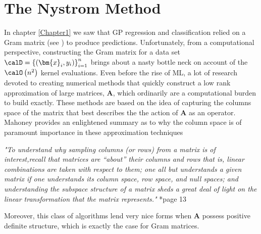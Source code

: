 \section{The Nystrom Method}\label{Chapter2}
In chapter \ref{Chapter1} we saw that GP regression and classification relied on a Gram matrix (see ) to produce predictions. Unfortunately, from a computational perspective, constructing the Gram matrix for a data set $\calD = \left\{ \left( \bm{x}_i , y_{i} \right) \right\}_{i=1}^{n}$ brings about a nasty bottle neck on account of the $\calO \left( n^2 \right)$ kernel evaluations. Even before the rise of ML, a lot of research devoted to creating numerical methods that quickly construct a low rank approximation of large matrices, $\bm{A}$, which ordinarily are a computational burden to build exactly. These methods are based on the idea of capturing the columns space of the matrix that best describes the the action of $\bm{A}$ as an operator. Mahoney provides an enlightened summary as to why the column space is of paramount importance in these approximation techniques
\begin{center}
    \emph{"To understand why sampling columns (or rows) from a matrix is of interest,recall that matrices are “about” their columns and rows that is, linear combinations are taken with respect to them; one all but understands a given matrix if one understands its column space, row space, and null
        spaces; and understanding the subspace structure of a matrix sheds a great deal of light on the linear transformation that the matrix represents."} \cite{DBLP:journals/corr/abs-1104-5557}*{page 13}
\end{center}
Moreover, this class of algorithms lend very nice forms when $\bm{A}$ possess positive definite structure, which is exactly the case for Gram matrices.





